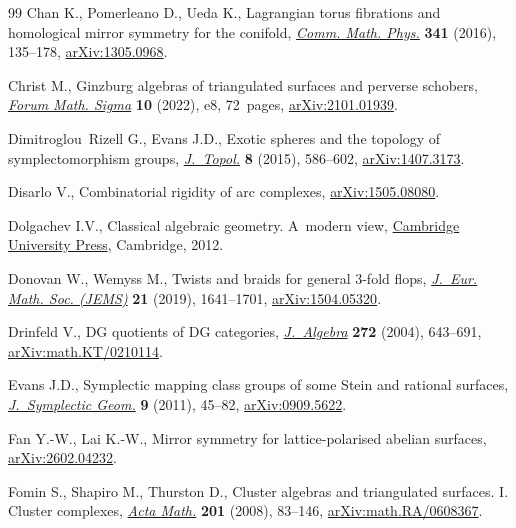 \documentclass[10pt,a4paper]{amsart}
\theoremstyle{definition}
\numberwithin{equation}{section}
\begin{document}
\begin{thebibliography}{99}
Chan K., Pomerleano D., Ueda K., Lagrangian torus fibrations and homological
 mirror symmetry for the conifold,
 \href{https://doi.org/10.1007/s00220-015-2477-7}{\textit{Comm. Math. Phys.}}
 \textbf{341} (2016), 135--178,
 \href{http://arxiv.org/abs/1305.0968}{arXiv:1305.0968}.

Christ M., Ginzburg algebras of triangulated surfaces and perverse schobers,
 \href{https://doi.org/10.1017/fms.2022.1}{\textit{Forum Math. Sigma}}
 \textbf{10} (2022), e8, 72~pages,
 \href{http://arxiv.org/abs/2101.01939}{arXiv:2101.01939}.

Dimitroglou~Rizell G., Evans J.D., Exotic spheres and the topology of
 symplectomorphism groups,
 \href{https://doi.org/10.1112/jtopol/jtv007}{\textit{J.~Topol.}} \textbf{8}
 (2015), 586--602, \href{http://arxiv.org/abs/1407.3173}{arXiv:1407.3173}.

Disarlo V., Combinatorial rigidity of arc complexes,
 \href{http://arxiv.org/abs/1505.08080}{arXiv:1505.08080}.

Dolgachev I.V., Classical algebraic geometry. {A}~modern view,
 \href{https://doi.org/10.1017/CBO9781139084437}{Cambridge University Press},
 Cambridge, 2012.

Donovan W., Wemyss M., Twists and braids for general 3-fold flops,
 \href{https://doi.org/10.4171/JEMS/868}{\textit{J.~Eur. Math. Soc. (JEMS)}}
 \textbf{21} (2019), 1641--1701,
 \href{http://arxiv.org/abs/1504.05320}{arXiv:1504.05320}.

Drinfeld V., D{G} quotients of {DG} categories,
 \href{https://doi.org/10.1016/j.jalgebra.2003.05.001}{\textit{J.~Algebra}}
 \textbf{272} (2004), 643--691,
 \href{http://arxiv.org/abs/math.KT/0210114}{arXiv:math.KT/0210114}.

Evans J.D., Symplectic mapping class groups of some {S}tein and rational
 surfaces,
 \href{https://doi.org/10.4310/jsg.2011.v9.n1.a4}{\textit{J.~Symplectic
 Geom.}} \textbf{9} (2011), 45--82,
 \href{http://arxiv.org/abs/0909.5622}{arXiv:0909.5622}.

Fan Y.-W., Lai K.-W., Mirror symmetry for lattice-polarised abelian surfaces,
 \href{http://arxiv.org/abs/2602.04232}{arXiv:2602.04232}.

Fomin S., Shapiro M., Thurston D., Cluster algebras and triangulated surfaces.
 {I}. {C}luster complexes,
 \href{https://doi.org/10.1007/s11511-008-0030-7}{\textit{Acta Math.}}
 \textbf{201} (2008), 83--146,
 \href{http://arxiv.org/abs/math.RA/0608367}{arXiv:math.RA/0608367}.


\end{thebibliography}
\end{document}
